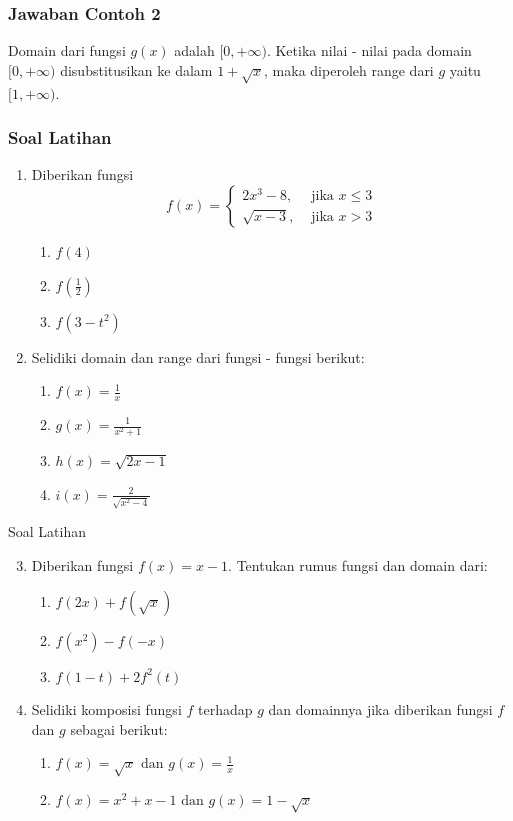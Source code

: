 \documentclass[pdflatex,compress,mathserif]{beamer}
\begin{document}
		\begin{frame}
			\frametitle{Jawaban Contoh 2}
			Domain dari fungsi $ g(x) $ adalah $ [0, +\infty) $. Ketika nilai - nilai pada domain $ [0, +\infty) $ disubstitusikan ke dalam $ 1 + \sqrt{x} $, maka diperoleh range dari $ g $ yaitu $ [1, +\infty) $.
		\end{frame}
		
		\begin{frame}
			\frametitle{Soal Latihan}
			\begin{enumerate}
				\item Diberikan fungsi
				\begin{equation*}
					f(x) = \begin{cases}
						2x^3 - 8,	& \text{ jika } x \leq 3\\
						\sqrt{x-3}, & \text{ jika } x > 3
					\end{cases}
				\end{equation*}
				\begin{enumerate}
					\item $ f(4) $
					\item $ f(\frac{1}{2}) $
					\item $ f(3 - t^2) $
				\end{enumerate}
				\item Selidiki domain dan range dari fungsi - fungsi berikut:
				\begin{enumerate}
					\item $ f(x) = \frac{1}{x} $
					\item $ g(x) = \frac{1}{x^2 + 1} $
					\item $ h(x) = \sqrt{2x - 1}$
					\item $ i(x) = \frac{2}{\sqrt{x^2 - 4}} $
				\end{enumerate}
			\end{enumerate}
		\end{frame}
		
		\begin{frame}{Soal Latihan}
			\begin{enumerate}\setcounter{enumi}{2}
				\item Diberikan fungsi $ f(x) = x- 1 $. Tentukan rumus fungsi dan domain dari:
				\begin{enumerate}
					\item $ f(2x) + f(\sqrt{x}) $
					\item $ f(x^2) - f(-x) $
					\item $ f(1-t) + 2f^2(t) $
				\end{enumerate}
				\item Selidiki komposisi fungsi $ f $ terhadap $ g $ dan domainnya jika diberikan fungsi $ f $ dan $ g $ sebagai berikut:
				\begin{enumerate}
					\item $ f(x) = \sqrt{x} \text{ dan } g(x) = \frac{1}{x}$
					\item $ f(x) = x^2 + x - 1 \text{ dan } g(x) = 1 - \sqrt{x} $
				\end{enumerate}
			\end{enumerate}
		\end{frame}
	
\end{document}
